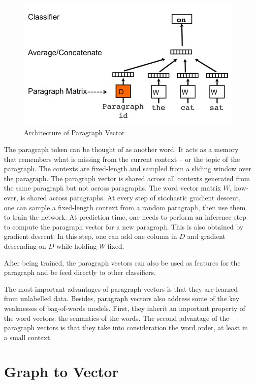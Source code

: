 \documentclass[]{article}
\begin{document}
\begin{figure}[h]\centering\includegraphics[width=\textwidth]{source//images/posts/paragraph-vec.png}\caption{Architecture of Paragraph Vector}\label{fig:paragraph-vec}\end{figure}

The paragraph token can be thought of as another word. It acts as a
memory that remembers what is missing from the current context -- or the
topic of the paragraph. The contexts are fixed-length and sampled from a
sliding window over the paragraph. The paragraph vector is shared across
all contexts generated from the same paragraph but not across
paragraphs. The word vector matrix \(W\), how-ever, is shared across
paragraphs. At every step of stochastic gradient descent, one can sample
a fixed-length context from a random paragraph, then use them to train
the network. At prediction time, one needs to perform an inference step
to compute the paragraph vector for a new paragraph. This is also
obtained by gradient descent. In this step, one can add one column in
\(D\) and gradient descending on \(D\) while holding \(W\) fixed.

After being trained, the paragraph vectors can also be used as features
for the paragraph and be feed directly to other classifiers.

The most important advantages of paragraph vectors is that they are
learned from unlabelled data. Besides, paragraph vectors also address
some of the key weaknesses of bag-of-words models. First, they inherit
an important property of the word vectors: the semantics of the words.
The second advantage of the paragraph vectors is that they take into
consideration the word order, at least in a small context.

\section{Graph to Vector}\label{graph-to-vector}
\end{document}
